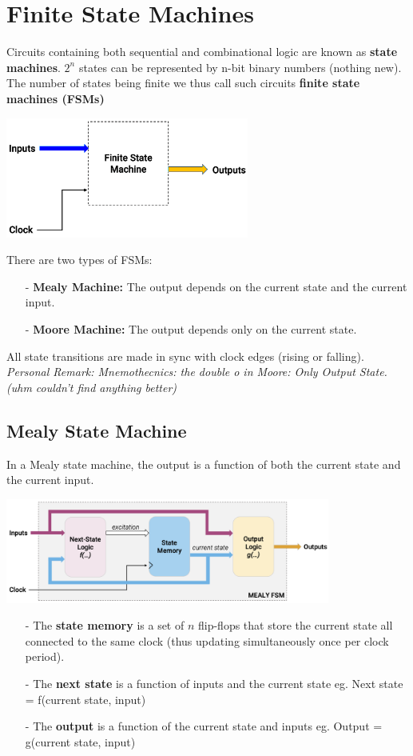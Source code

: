 \documentclass[12pt,openany]{book}
\begin{document}
\section{Finite State Machines}
Circuits containing both sequential and combinational logic are known as \textbf{state machines}. $2^n$ states can be represented by n-bit binary numbers (nothing new). The number of states being finite we thus call such circuits \textbf{finite state machines (FSMs)}
\newline 
\begin{center}
\includegraphics[width=0.6\textwidth]{circuits/13.1.png}
\end{center}
There are two types of FSMs:
\begin{itemize}
	\item[-] \textbf{Mealy Machine:} The output depends on the current state and the current input.
	\item[-] \textbf{Moore Machine:} The output depends only on the current state.
\end{itemize}
All state transitions are made in sync with clock edges (rising or falling).
\textit{Personal Remark: Mnemothecnics: the double o in Moore: Only Output State. (uhm couldn't find anything better)}
\newpage
\subsection{Mealy State Machine}
In a Mealy state machine, the output is a function of both the current state and the current input. 
\begin{center}
	\includegraphics[width=0.8\textwidth]{circuits/13.1.1.png}
\end{center}

\begin{itemize} 
	\item[-] The \textbf{state memory} is a set of $n$ flip-flops that store the current state all connected to the same clock (thus updating simultaneously once per clock period).
	\item[-] The \textbf{next state} is a function of inputs and the current state \newline eg. Next state = f(current state, input)
	\item[-] The \textbf{output} is a function of the current state and inputs \newline eg. Output = g(current state, input)
\end{itemize}
\end{document}
